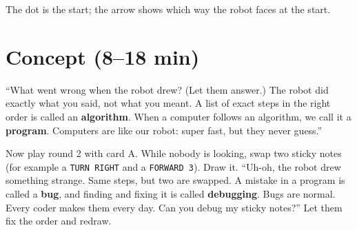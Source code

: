 \begin{center}

{\small The dot is the start; the arrow shows which way the robot faces at the start.}
\end{center}

\section{Concept (8--18 min)}
\begin{teacherscript}
\enquote{What went wrong when the robot drew? (Let them answer.) The robot did exactly what you said, not what you meant. A list of exact steps in the right order is called an \textbf{algorithm}. When a computer follows an algorithm, we call it a \textbf{program}. Computers are like our robot: super fast, but they never guess.}

Now play round 2 with card A. While nobody is looking, swap two sticky notes (for example a \texttt{TURN RIGHT} and a \texttt{FORWARD 3}). Draw it. \enquote{Uh-oh, the robot drew something strange. Same steps, but two are swapped. A mistake in a program is called a \textbf{bug}, and finding and fixing it is called \textbf{debugging}. Bugs are normal. Every coder makes them every day. Can you debug my sticky notes?} Let them fix the order and redraw.
\end{teacherscript}

